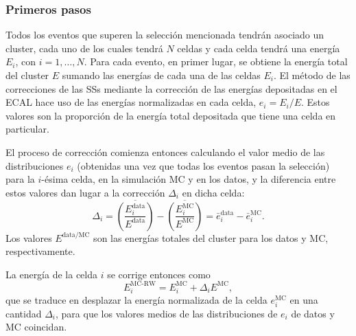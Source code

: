 \subsubsection{Primeros pasos}
\label{subsubsec:ss_corrections:cell_rw:calculation:previous}

Todos los eventos que superen la selección mencionada tendrán asociado un cluster, cada uno de los cuales tendrá \(N\) celdas y cada celda tendrá una energía \(E_i\), con \(i=1,\dots,N\). Para cada evento, en primer lugar, se obtiene la energía total del cluster \(E\) sumando las energ\'ias de cada una de las celdas \(E_i\).
El m\'etodo de las correcciones de las \acp{SS} mediante la correcci\'on de las energ\'ias depositadas en el \ac{ECAL} hace uso de las energ\'ias normalizadas en cada celda, \(e_i = E_i/E\). Estos valores son la proporci\'on de la energ\'ia total depositada que tiene una celda en particular.

El proceso de correcci\'on comienza entonces calculando el valor medio de las distribuciones \(e_i\) (obtenidas una vez que todas los eventos pasan la selecci\'on) para la \(i\)-\'esima celda, en la simulaci\'on \ac{MC} y en los datos, y la diferencia entre estos valores dan lugar a la correcci\'on \(\Delta_i\) en dicha celda:
\begin{equation}
    \label{eq:ss_corrections:cell_rw:calculation:previous:old_corrections}
    \Delta_i = \overline{\left( \frac{ E_i^{\text{data}} }{ E^{\text{data}} } \right)} - \overline{\left( \frac{ E_i^{\text{MC}} }{ E^{\text{MC}} } \right)}
    = \bar e_i^{\text{data}} - \bar e_i^{\text{MC}}.
\end{equation}
Los valores \(E^{\text{data/MC}}\) son las energías totales del cluster para los datos y \ac{MC}, respectivamente.

La energ\'ia de la celda \(i\) se corrige entonces como
\begin{equation}
    \label{eq:ss_corrections:cell_rw:calculation:previous:correction_method}
    E_i^{\text{MC-RW}} = E_i^{\text{MC}} + \Delta_i E^{\text{MC}},
\end{equation}
que se traduce en desplazar la energía normalizada de la celda \(e_i^{\text{MC}}\) en una cantidad \(\Delta_i\), para que los valores medios de las distribuciones de \(e_i\) de datos y \ac{MC} coincidan. 


